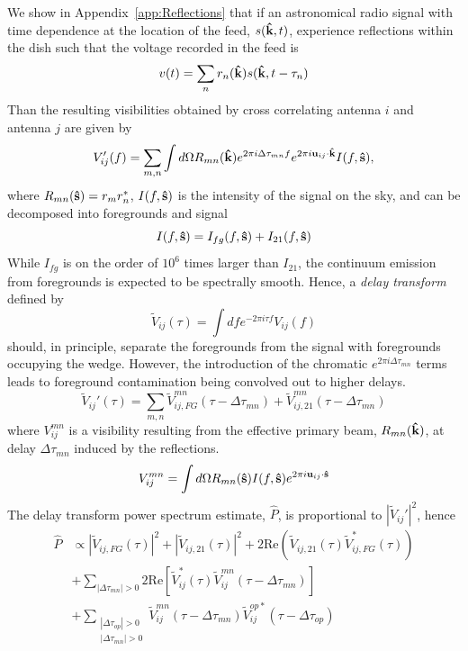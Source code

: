 \documentclass[twocolumn]{emulateapj}
\begin{document}
 We show in Appendix~\ref{app:Reflections} that if an astronomical radio signal with time dependence at the location of the feed, $s({\bf \hat{k}},t)$, experience reflections within the dish such that the voltage recorded in the feed is 
\begin{equation}
v(t) = \sum_n r_n({\bf \hat{k}}) s({\bf \hat{k}},t - \tau_n)
\end{equation}
Than the resulting visibilities obtained by cross correlating antenna $i$ and antenna $j$ are given by 
\begin{equation}
V'_{ij}(f) = \sum_{m,n} \int d \Omega R_{mn}({\bf \hat{k}}) e^{2 \pi i \Delta \tau_{mn}f} e^{2 \pi i {\bf u}_{ij} \cdot {\bf \hat{k}}} I(f,{\bf \hat{s}}),
\end{equation}
where $R_{mn}({\bf \hat{s}})=r_m r_n^*$, $I(f,{\bf \hat{s}})$ is the intensity of the signal on the sky, and can be decomposed into foregrounds and signal
\begin{equation}
I(f,{\bf \hat{s}}) = I_{fg}(f,{\bf \hat{s}})+I_{21}(f,{\bf \hat{s}})
\end{equation}
While $I_{fg}$ is on the order of $10^6$ times larger than $I_{21}$, the continuum emission from foregrounds is expected to be spectrally smooth. Hence, a {\it delay transform} defined by
\begin{equation}
\widetilde{V}_{ij}(\tau) = \int d f e^{-2 \pi i \tau f} V_{ij}(f)
\end{equation}
should, in principle, separate the foregrounds from the signal with foregrounds occupying the wedge. However, the introduction of the chromatic $e^{2 \pi i \Delta \tau_{mn}}$ terms leads to foreground contamination being convolved out to higher delays.
\begin{equation}
\widetilde{V}_{ij}'(\tau) = \sum_{m,n} \widetilde{V}_{ij,FG}^{mn}(\tau - \Delta \tau_{mn}) + \widetilde{V}_{ij,21}^{mn}(\tau - \Delta \tau_{mn})
\end{equation}
where $V_{ij}^{mn}$ is a visibility resulting from the effective primary beam, $R_{mn}({\bf \hat{k}})$, at delay $\Delta \tau_{mn}$ induced by the reflections.
\begin{equation}
V_{ij}^{mn} = \int d \Omega R_{mn}({\bf \hat{s}}) I(f,{\bf \hat{s}})e^{2 \pi i {\bf u}_{ij} \cdot {\bf \hat{s}}}
\end{equation}
The delay transform power spectrum estimate, $\widehat{P}$, is proportional to $|\widetilde{V}_{ij}'|^2$, hence 
\begin{align}\label{eq:Reflections}
\widehat{P} & \propto |\widetilde{V}_{ij,FG}(\tau)|^2 + |\widetilde{V}_{ij,21}(\tau)|^2 + 2 \text{Re}(\widetilde{V}_{ij,21}(\tau)\widetilde{V}_{ij,FG}^*(\tau)) \nonumber \\
&+ \sum_{|\Delta \tau_{mn}| > 0} 2 \text{Re} \left[   \widetilde{V}^*_{ij} (\tau) \widetilde{V}^{mn}_{ij} (\tau - \Delta \tau_{mn})  \right] \nonumber \\
&+ \sum_{\substack{|\Delta \tau_{op}|>0\\|\Delta \tau_{mn}|>0}} \widetilde{V}^{mn}_{ij} (\tau - \Delta \tau_{mn}) \widetilde{V}^{op*}_{ij}(\tau - \Delta \tau_{op})
\end{align}
\end{document}
